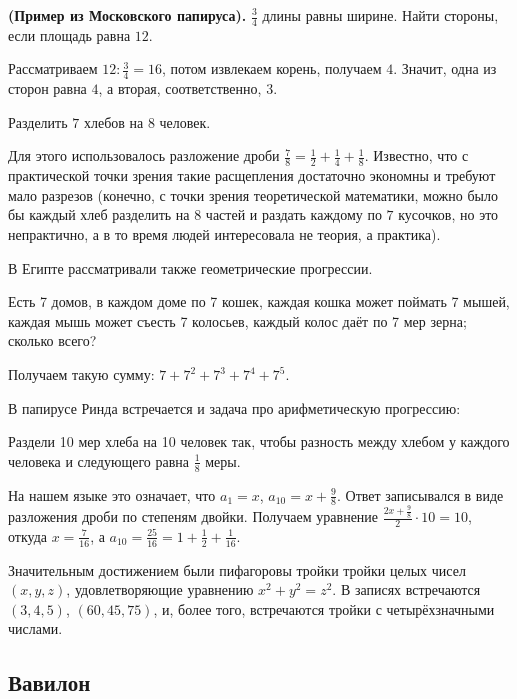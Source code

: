 \documentclass[a4paper,oneside,fleqn,10pt]{article}
\begin{document}
\begin{ex} \textbf{(Пример из Московского папируса).}
$\frac34$ длины равны ширине. Найти стороны, если площадь равна $12$.
\end{ex}
\begin{solution}
Рассматриваем $12:\frac34 = 16$, потом извлекаем корень, получаем
$4$. Значит, одна из сторон равна $4$, а вторая, соответственно, $3$.
\end{solution}

\begin{ex}
Разделить $7$ хлебов на $8$ человек.
\end{ex}
\begin{solution}
Для этого использовалось разложение дроби $\frac78 =
\frac12+\frac14+\frac18$. Известно, что с практической точки зрения
такие расщепления достаточно экономны и требуют мало разрезов
(конечно, с точки зрения теоретической математики, можно было бы
каждый хлеб разделить на $8$ частей и раздать каждому по $7$ кусочков,
но это непрактично, а в то время людей интересовала не теория, а
практика).
\end{solution}

В Египте рассматривали также геометрические прогрессии.
\begin{problem}
Есть 7 домов, в каждом доме по 7 кошек, каждая кошка может поймать 7
мышей, каждая мышь может съесть 7 колосьев, каждый колос даёт по 7 мер
зерна; сколько всего?
\end{problem}
Получаем такую сумму: $7 + 7^2 + 7^3 + 7^4 + 7^5$.

В папирусе Ринда встречается и задача про арифметическую прогрессию:
\begin{problem}
Раздели 10 мер хлеба на 10 человек так, чтобы разность между хлебом у
каждого человека и следующего равна $\frac18$ меры.
\end{problem}

На нашем языке это означает, что $a_1 = x$, $a_{10} = x+\frac98$.
Ответ записывался в виде разложения дроби по степеням двойки.
Получаем уравнение $\frac{2x + \frac98}{2}\cdot 10 = 10$, откуда $x =
\frac{7}{16}$, а $a_{10} = \frac{25}{16} = 1 + \frac12 + \frac1{16}$.

Значительным достижением были пифагоровы тройки тройки целых чисел
$(x,y,z)$, удовлетворяющие уравнению $x^2 + y^2 = z^2$. В записях
встречаются $(3,4,5)$, $(60,45,75)$, и, более того, встречаются тройки
с четырёхзначными числами.

\subsection{Вавилон}
\end{document}
